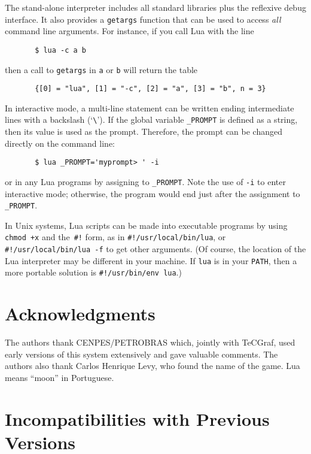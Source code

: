\documentclass[11pt,twoside,draft]{article}
\makeatletter
\newcommand{\T}[1]{{\tt #1}}
\def\tecgraf{{\sf TeCGraf}}
\newcommand{\IndexVerb}[1]{\T{#1}\index{#1@{\tt #1}}}
\newcommand{\DefLIB}[1]{\index{#1@{\tt #1}}}
\makeatother
\begin{document}
The stand-alone interpreter includes
all standard libraries plus the reflexive debug interface.
It also provides a \verb|getargs| function that
can be used to access \emph{all} command line arguments.
\DefLIB{getargs}
For instance, if you call Lua with the line
\begin{verbatim}
       $ lua -c a b
\end{verbatim}
then a call to \verb|getargs| in \verb|a| or \verb|b| will return the table
\begin{verbatim}
       {[0] = "lua", [1] = "-c", [2] = "a", [3] = "b", n = 3}
\end{verbatim}

In interactive mode,
a multi-line statement can be written ending intermediate
lines with a backslash (`\verb|\|').
If the global variable \IndexVerb{_PROMPT} is defined as a string,
then its value is used as the prompt.
Therefore, the prompt can be changed directly on the command line:
\begin{verbatim}
       $ lua _PROMPT='myprompt> ' -i
\end{verbatim}
or in any Lua programs by assigning to \verb|_PROMPT|.
Note the use of \verb|-i| to enter interactive mode; otherwise,
the program would end just after the assignment to \verb|_PROMPT|.

In Unix systems, Lua scripts can be made into executable programs
by using \verb|chmod +x| and the~\verb|#!| form,
as in \verb|#!/usr/local/bin/lua|,
or \verb|#!/usr/local/bin/lua -f| to get other arguments.
(Of course,
the location of the Lua interpreter may be different in your machine.
If \verb|lua| is in your \verb|PATH|,
then a more portable solution is \verb|#!/usr/bin/env lua|.)


\section*{Acknowledgments}

The authors thank CENPES/PETROBRAS which,
jointly with \tecgraf, used early versions of
this system extensively and gave valuable comments.
The authors also thank Carlos Henrique Levy,
who found the name of the game.
Lua means ``moon'' in Portuguese.


\appendix

\section*{Incompatibilities with Previous Versions}
\end{document}
